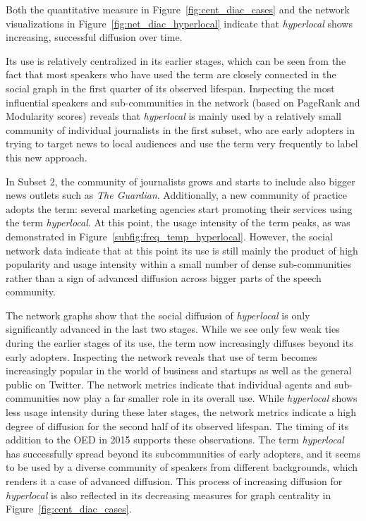 \documentclass[
  a4paper,
  abstract=on,
  captions=tableabove,
  ]{scrartcl}
\newcommand{\ol}[1]{\emph{#1}}
\begin{document}
      Both the quantitative measure in Figure~\ref{fig:cent_diac_cases} and the network visualizations in Figure~\ref{fig:net_diac_hyperlocal} indicate that \ol{hyperlocal} shows increasing, successful diffusion over time.

      Its use is relatively centralized in its earlier stages, which can be seen from the fact that most speakers who have used the term are closely connected in the social graph in the first quarter of its observed lifespan. Inspecting the most influential speakers and sub-communities in the network (based on PageRank and Modularity scores) reveals that \ol{hyperlocal} is mainly used by a relatively small community of individual journalists in the first subset, who are early adopters in trying to target news to local audiences and use the term very frequently to label this new approach.

      In Subset 2, the community of journalists grows and starts to include also bigger news outlets such as \emph{The Guardian}. Additionally, a new community of practice adopts the term: several marketing agencies start promoting their services using the term \ol{hyperlocal}. At this point, the usage intensity of the term peaks, as was demonstrated in Figure~\ref{subfig:freq_temp_hyperlocal}. However, the social network data indicate that at this point its use is still mainly the product of high popularity and usage intensity within a small number of dense sub-communities rather than a sign of advanced diffusion across bigger parts of the speech community.

      The network graphs show that the social diffusion of \ol{hyperlocal} is only significantly advanced in the last two stages. While we see only few weak ties during the earlier stages of its use, the term now increasingly diffuses beyond its early adopters. Inspecting the network reveals that use of term becomes increasingly popular in the world of business and startups as well as the general public on Twitter. The network metrics indicate that individual agents and sub-communities now play a far smaller role in its overall use. While \ol{hyperlocal} shows less usage intensity during these later stages, the network metrics indicate a high degree of diffusion for the second half of its observed lifespan. The timing of its addition to the OED in 2015 supports these observations. The term \ol{hyperlocal} has successfully spread beyond its subcommunities of early adopters, and it seems to be used by a diverse community of speakers from different backgrounds, which renders it a case of advanced diffusion. This process of increasing diffusion for \ol{hyperlocal} is also reflected in its decreasing measures for graph centrality in Figure~\ref{fig:cent_diac_cases}.
\end{document}
